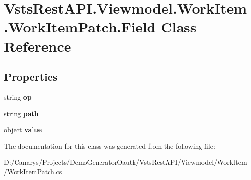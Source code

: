 \hypertarget{class_vsts_rest_a_p_i_1_1_viewmodel_1_1_work_item_1_1_work_item_patch_1_1_field}{}\section{Vsts\+Rest\+A\+P\+I.\+Viewmodel.\+Work\+Item.\+Work\+Item\+Patch.\+Field Class Reference}
\label{class_vsts_rest_a_p_i_1_1_viewmodel_1_1_work_item_1_1_work_item_patch_1_1_field}
\subsection*{Properties}
\begin{DoxyCompactItemize}
\item 
\mbox{\label{class_vsts_rest_a_p_i_1_1_viewmodel_1_1_work_item_1_1_work_item_patch_1_1_field_a47484809be9e029acf2c0a9025cfc973}} 
string {\bfseries op}
\item 
\mbox{\label{class_vsts_rest_a_p_i_1_1_viewmodel_1_1_work_item_1_1_work_item_patch_1_1_field_a16dff5a6958e684bd3cf9794a46f7641}} 
string {\bfseries path}
\item 
\mbox{\label{class_vsts_rest_a_p_i_1_1_viewmodel_1_1_work_item_1_1_work_item_patch_1_1_field_abb949b7e7d4a2a1bc6b05d0e5f2370b2}} 
object {\bfseries value}
\end{DoxyCompactItemize}


The documentation for this class was generated from the following file\+:\begin{DoxyCompactItemize}
\item 
D\+:/\+Canarys/\+Projects/\+Demo\+Generator\+Oauth/\+Vsts\+Rest\+A\+P\+I/\+Viewmodel/\+Work\+Item/Work\+Item\+Patch.\+cs\end{DoxyCompactItemize}
